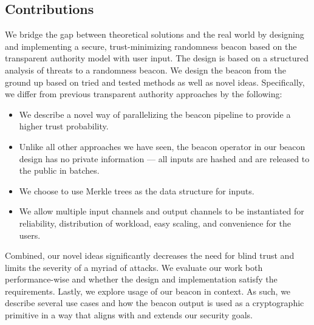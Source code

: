 \subsection{Contributions}
We bridge the gap between theoretical solutions and the real world by designing and implementing a secure, trust-minimizing randomness beacon based on the transparent authority model with user input.
The design is based on a structured analysis of threats to a randomness beacon.
We design the beacon from the ground up based on tried and tested methods as well as novel ideas.
Specifically, we differ from previous transparent authority approaches by the following:
\begin{itemize}
    \item We describe a novel way of parallelizing the beacon pipeline  to provide a higher trust probability.
    \item Unlike all other approaches we have seen, the beacon operator in our beacon design has no private information --- all inputs are hashed and are released to the public in batches.
    \item We choose to use Merkle trees as the data structure for inputs. 
    \item We allow multiple input channels and output channels to be instantiated for reliability, distribution of workload, easy scaling, and convenience for the users.
\end{itemize}
Combined, our novel ideas significantly decreases the need for blind trust and limits the severity of a myriad of attacks.
We evaluate our work both performance-wise and whether the design and implementation satisfy the requirements.
Lastly, we explore usage of our beacon in context. As such, we describe several use cases and how the beacon output is used as a cryptographic primitive in a way that aligns with and extends our security goals.
